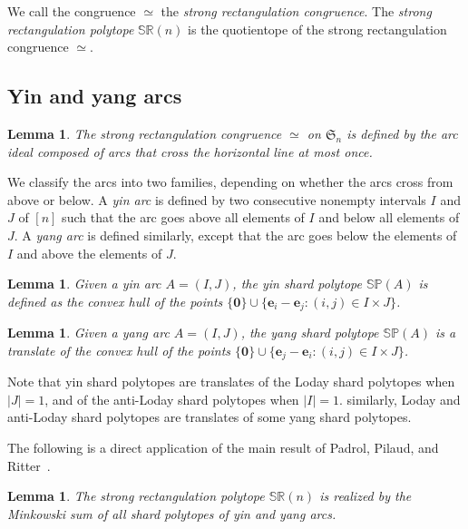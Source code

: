 \documentclass{amsart}
\newtheorem{lemma}[theorem]{Lemma}
\theoremstyle{definition}
\newcommand{\f}[1]{\mathfrak{#1}} %
\newcommand{\darkblue}{\color{darkblue}} %
\newcommand{\defn}[1]{\textsl{\darkblue #1}} %
\newcommand{\jean}[2][]{\todo[size=\scriptsize, color=orange!30,#1]{\rm #2 \\ \hfill --- J.}}
\newcommand{\polytope}[1]{\mathds{#1}} %
\newcommand{\SRP}{\polytope{SR}} %
\newcommand{\SP}{\polytope{SP}}
\newcommand{\strongeq}{\simeq}%
\begin{document}
We call the congruence $\strongeq$ the \defn{strong rectangulation congruence}.
The \defn{strong rectangulation polytope} $\SRP(n)$ is the quotientope of the strong rectangulation congruence $\strongeq$.

\jean{Does the congruence have a name?}

\subsection{Yin and yang arcs}

\begin{lemma}
  The strong rectangulation congruence $\strongeq$ on $\f{S}_n$ is defined by the arc ideal composed of arcs that cross the horizontal line at most once.
\end{lemma}

We classify the arcs into two families, depending on whether the arcs cross from above or below.
A \defn{yin arc} is defined by two consecutive nonempty intervals $I$ and $J$ of $[n]$ such that the arc goes above all elements of $I$ and below all elements of $J$.
A \defn{yang arc} is defined similarly, except that the arc goes below the elements of $I$ and above the elements of $J$. 

\begin{lemma}
  \label{lem:yinsp}
  Given a yin arc $A=(I,J)$, the yin shard polytope $\SP(A)$ is defined as the convex hull of the points
  $\{\mathbf{0} \}\cup \{ \mathbf{e}_i - \mathbf{e}_j : (i,j)\in I\times J\}$.
\end{lemma}

\begin{lemma}
  \label{lem:yangsp}
  Given a yang arc $A=(I,J)$, the yang shard polytope $\SP(A)$ is a translate of the convex hull of the points
  $\{\mathbf{0} \}\cup \{ \mathbf{e}_j - \mathbf{e}_i : (i,j)\in I\times J\}$.
\end{lemma}

Note that yin shard polytopes are translates of the Loday shard polytopes when $|J|=1$, and of the anti-Loday shard polytopes when $|I|=1$.
similarly, Loday and anti-Loday shard polytopes are translates of some yang shard polytopes.

The following is a direct application of the main result of Padrol, Pilaud, and Ritter~\cite{}.

\begin{lemma}
  \label{lem:strongsum}
  The strong rectangulation polytope $\SRP(n)$ is realized by the Minkowski sum of all shard polytopes of yin and yang arcs.
\end{lemma}
\end{document}

